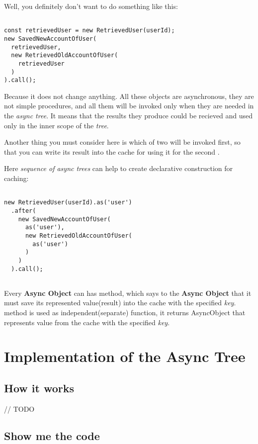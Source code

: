 \documentclass{article}
\newcommand{\cit}[1]{{\fontfamily{qcr}\selectfont{\textit{\textbf{\textcolor{darkgray}{#1}}}}}}
\begin{document}
\newpage

Well, you definitely don't want to do something like this:

\begin{lstlisting}

const retrievedUser = new RetrievedUser(userId);
new SavedNewAccountOfUser(
  retrievedUser,
  new RetrievedOldAccountOfUser(
    retrievedUser
  )
).call();

\end{lstlisting}

Because it does not change anything. All these objects are asynchronous, they are not simple procedures, and all them will be invoked only when they are needed in the \textit{async tree}. It means that the results they produce could be recieved and used only in the inner scope of the \textit{tree}.

Another thing you must consider here is which of two \cit{RetrievedUser} will be invoked first, so that you can write its result into the cache for using it for the second \cit{RetrievedUser}.

Here \textit{sequence of async trees} can help to create declarative construction for caching:

\begin{lstlisting}

new RetrievedUser(userId).as('user')
  .after(
    new SavedNewAccountOfUser(
      as('user'),
      new RetrievedOldAccountOfUser(
        as('user')
      )
    )
  ).call();
  
\end{lstlisting}

Every \textbf{Async Object} can has \cit{as(key)} method, which says to the \textbf{Async Object} that it must save its represented value(result) into the cache with the specified \textit{key}. \cit{as(key)} method is used as independent(separate) function, it returns AsyncObject that represents value from the cache with the specified \textit{key}.

\section{Implementation of the Async Tree}

\subsection{How it works}

// TODO

\subsection{Show me the code}
\end{document}
